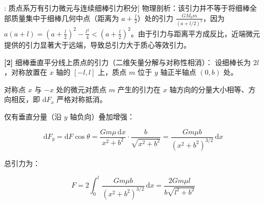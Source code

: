 \documentclass[11pt,a4paper,UTF8]{ctexart}
\begin{document}
\begin{thmbox}[模型[4]: 质点系万有引力微元与连续细棒引力积分]
物理剖析：该引力并不等于将细棒全部质量集中于细棒几何中点（距离为 $a + \frac{l}{2}$）处的引力 $\frac{G M_0 m}{(a + l/2)^2}$，因为 $a(a+l) = \left(a + \frac{l}{2}\right)^2 - \frac{l^2}{4} < \left(a + \frac{l}{2}\right)^2$。由于引力与距离平方成反比，近端微元提供的引力显著大于远端，导致总引力大于质心等效引力。

\textbf{[2]} 细棒垂直平分线上质点的引力（二维矢量分解与对称性相消）：
设细棒长为 $2l$，对称放置在 $x$ 轴的 $[-l, l]$ 上，质点 $m$ 位于 $y$ 轴正半轴点 $(0, b)$ 处。

对称点 $x$ 与 $-x$ 处的微元对质点 $m$ 产生的引力在 $x$ 轴方向的分量大小相等、方向相反，即 $\mathrm{d}F_x$ 严格对称抵消。

仅有垂直分量（沿 $y$ 轴负向）叠加增强：


\begin{equation*}
\mathrm{d}F_y = \mathrm{d}F \cos\theta = \frac{G m \mu\,\mathrm{d}x}{x^2 + b^2} \cdot \frac{b}{\sqrt{x^2 + b^2}} = \frac{G m \mu b}{(x^2 + b^2)^{3/2}}\,\mathrm{d}x
\end{equation*}


总引力为：


\begin{equation*}
F = 2 \int_0^l \frac{G m \mu b}{(x^2 + b^2)^{3/2}}\,\mathrm{d}x = \frac{2 G m \mu l}{b \sqrt{l^2 + b^2}}
\end{equation*}


\end{thmbox}
\end{document}
